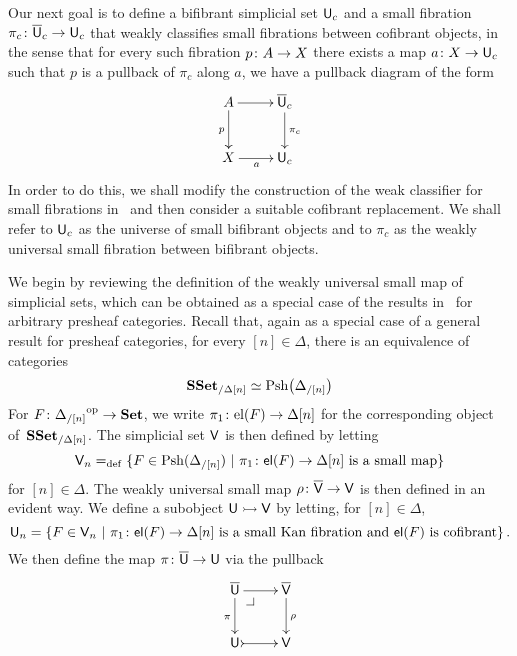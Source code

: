 \documentclass[reqno,10pt,a4paper,oneside,draft]{amsart}
\begin{document}
Our next goal is to define a bifibrant simplicial set $\mathsf{U}_c$ and a small fibration $\pi_c \colon \overline{\mathsf{U}}_c \to \mathsf{U}_c$ that weakly classifies small fibrations between cofibrant objects, in the sense that for every such fibration $p \colon A \to X$ there exists a map $a \colon X \to \mathsf{U}_c$ such that $p$ is a pullback of $\pi_c$ along $a$, \ie we have a pullback diagram of the form
\[
\xymatrix{
A \ar[r] \ar[d]_p   & \UU_c \ar[d]^{\pi_c} \\
X \ar[r]_a &  \U_c }
\]
In order to do this, we shall modify  the construction of the weak classifier for small fibrations 
in~\cite{voevodsky-simplicial-model} and then consider a suitable cofibrant replacement. 
We shall refer to $\mathsf{U}_c$ as the universe of small bifibrant objects and to $\pi_c$ as the 
weakly universal small fibration between bifibrant objects.


\medskip

We begin by reviewing the definition of the weakly universal small map of simplicial sets, which
can be obtained as a special case of the results in~\cite{hofmann-streicher-universes} for arbitrary presheaf
categories. Recall that, again as a special case of a general result for presheaf categories, for every $[n] \in \Delta$, there is an equivalence of categories
\begin{equation}
\label{equ:pshslice}
\mathbf{SSet}_{/\Delta[n]} \simeq \mathrm{Psh} \big( \Delta_{/[n]} \big )
\end{equation}
For $F \colon {\Delta_{/[n]}}^{\operatorname{op}} \to \mathbf{Set}$, we write $\pi_1 \colon \mathrm{el}(F) \to \Delta[n]$
for the corresponding object of~$\mathbf{SSet}_{/\Delta[n]}$. The simplicial set $\mathsf{V}$ is then defined by letting
\[
\mathsf{V}_n =_{\operatorname{def}} \{ F \in \mathrm{Psh}(\Delta_{/[n]}) \ | \ \pi_1 \colon \mathsf{el}(F) \to \Delta[n] \text{ is a small
map} \}
\]
for $[n] \in \Delta$. The weakly universal small map $\rho \colon \overline{\mathsf{V}} \to \mathsf{V}$ is then defined in an evident way. 
We define a subobject $\mathsf{U} \rightarrowtail \mathsf{V}$ by letting, for $[n] \in \Delta$, 
\[
\mathsf{U}_n = \{ F \in \mathsf{V}_n \ | \ \pi_1 \colon \mathsf{el}(F) \to \Delta[n] \text{ is a small Kan fibration and $\mathsf{el}(F)$ is cofibrant} \} \, .
\]
We then define the map $\pi \colon \overline{\mathsf{U}} \to \mathsf{U}$ via the pullback 
\[
\xymatrix{
\UU \ar[r] \ar[d]_\pi \drpullback  & \VV \ar[d]^\rho \\
\U \ar@{>->}[r] & \V }
\]
\end{document}

